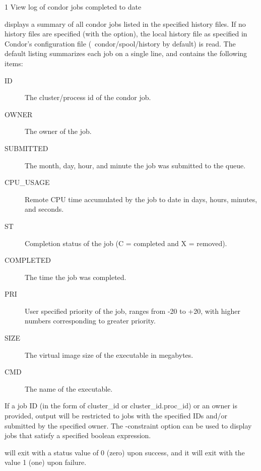 \begin{ManPage}{\label{man-condor-history}}{1}
{View log of condor jobs completed to date}
\Synopsis {}
  

\Description
{} displays a summary of all condor jobs listed in the
specified history files.  If no history files are specified (with the  option), the local
history file as specified in Condor's configuration file
(~condor/spool/history by default) is read.  The default listing
summarizes each job on a single line, and  contains the following items:


\begin{description}
\item[ID] The cluster/process id of the condor job. 
\item[OWNER] The owner of the job. 
\item[SUBMITTED] The month, day, hour, and minute the job was submitted to the queue. 
\item[CPU\_USAGE] Remote CPU time accumulated by the job to date in days, hours, minutes, and seconds.
\item[ST] Completion status of the job (C = completed and X = removed).
\item[COMPLETED] The time the job was completed.
\item[PRI] User specified priority of the job, ranges from -20 to +20, with higher numbers corresponding to greater priority. 
\item[SIZE] The virtual image size of the executable in megabytes. 
\item[CMD] The name of the executable. 
\end{description}

If a job ID (in the form of cluster\_id or cluster\_id.proc\_id) or an
owner is provided, output will be restricted to jobs with the
specified IDs and/or submitted by the specified owner.  
The -constraint option can be used to display jobs that satisfy a
specified boolean expression.

\begin{Options}
\end{Options}

\ExitStatus

 will exit with a status value of 0 (zero) upon success,
and it will exit with the value 1 (one) upon failure.

\end{ManPage}
